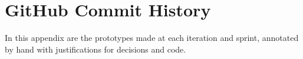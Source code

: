 \chapter{GitHub Commit History}

In this appendix are the prototypes made at each iteration and sprint, annotated by hand with justifications for decisions and code.